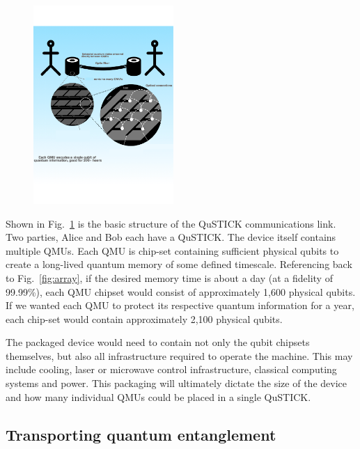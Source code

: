 \documentclass[twocolumn, aps, rmp, amsmath, amssymb, nofootinbib, superscriptaddress, longbibliography, floatfix, table-of-contents, eqsecnum]{revtex4-2}
\begin{document}
\begin{figure}[htbp!]
	\includegraphics[clip=true, width=0.475\textwidth]{qustick1}
	\caption{} \label{fig:qustick1}
\end{figure}

Shown in Fig.~\ref{fig:qustick1} is the basic structure of the QuSTICK communications link. Two parties, Alice and Bob each have a QuSTICK. The device itself contains multiple QMUs. Each QMU is chip-set containing sufficient physical qubits to create a long-lived quantum memory of some defined timescale. Referencing back to Fig.~\ref{fig:array}, if the desired memory time is about a day (at a fidelity of 99.99\%), each QMU chipset would consist of approximately 1,600 physical qubits. If we wanted each QMU to protect its respective quantum information for a year, each chip-set would contain approximately 2,100 physical qubits. 

The packaged device would need to contain not only the qubit chipsets themselves, but also all infrastructure required to operate the machine. This may include cooling, laser or microwave control infrastructure, classical computing systems and power. This packaging will ultimately dictate the size of the device and how many individual QMUs could be placed in a single QuSTICK.

\subsection{Transporting quantum entanglement}
\end{document}
